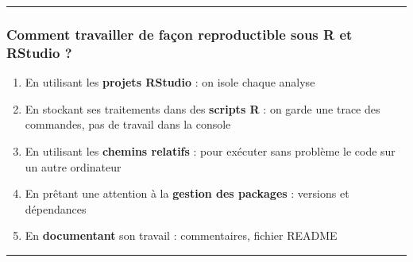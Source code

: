 \documentclass[
  french,
  10pt,
  a4paper,
]{article}
\providecommand{\tightlist}{%
  \setlength{\itemsep}{0pt}\setlength{\parskip}{0pt}}
\begin{document}
\begin{center}\rule{0.5\linewidth}{0.5pt}\end{center}

\subsubsection{\texorpdfstring{Comment travailler de façon reproductible
sous \textbf{R} et \textbf{RStudio}
?}{Comment travailler de façon reproductible sous R et RStudio ?}}\label{comment-travailler-de-fauxe7on-reproductible-sous-r-et-rstudio}

\begin{enumerate}
\def\labelenumi{\arabic{enumi}.}
\tightlist
\item
  En utilisant les \textbf{projets RStudio} : on isole chaque analyse
\item
  En stockant ses traitements dans des \textbf{scripts R} : on garde une
  trace des commandes, pas de travail dans la console
\item
  En utilisant les \textbf{chemins relatifs} : pour exécuter sans
  problème le code sur un autre ordinateur
\item
  En prêtant une attention à la \textbf{gestion des packages} : versions
  et dépendances
\item
  En \textbf{documentant} son travail : commentaires, fichier README
\end{enumerate}

\begin{center}\rule{0.5\linewidth}{0.5pt}\end{center}
\end{document}
